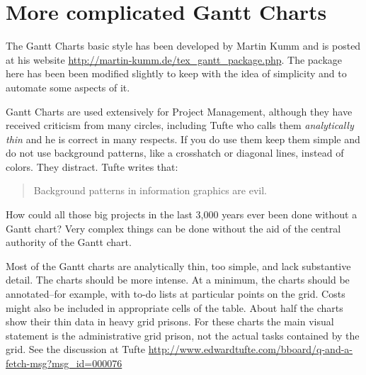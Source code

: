 \section{More complicated Gantt Charts}
\label{ganttcharts}
The Gantt Charts basic style has been developed by 
Martin Kumm and is posted at his website \url{http://martin-kumm.de/tex_gantt_package.php}. The package here has been been modified slightly to keep with the idea of simplicity and to automate some aspects of it. 


Gantt Charts are used extensively for Project Management, although they have received criticism from many circles, including Tufte who calls them \textit{analytically thin} and he is correct in many respects. If you do use them keep them simple and do not use background patterns, like a crosshatch or diagonal lines, instead of colors. They distract. Tufte writes that: 

\begin{quotation} 
   Background patterns in information graphics are evil.
\end{quotation} 

How could all those big projects in the last 3,000 years ever been done without a Gantt chart? Very complex things can be done without the aid of the central authority of the Gantt chart.

Most of the Gantt charts are analytically thin, too simple, and lack substantive detail. The charts should be more intense. At a minimum, the charts should be annotated--for example, with to-do lists at particular points on the grid. Costs might also be included in appropriate cells of the table. About half the charts show their thin data in heavy grid prisons. For these charts the main visual statement is the administrative grid prison, not the actual tasks contained by the grid. See the discussion at Tufte \url{http://www.edwardtufte.com/bboard/q-and-a-fetch-msg?msg_id=000076} 


